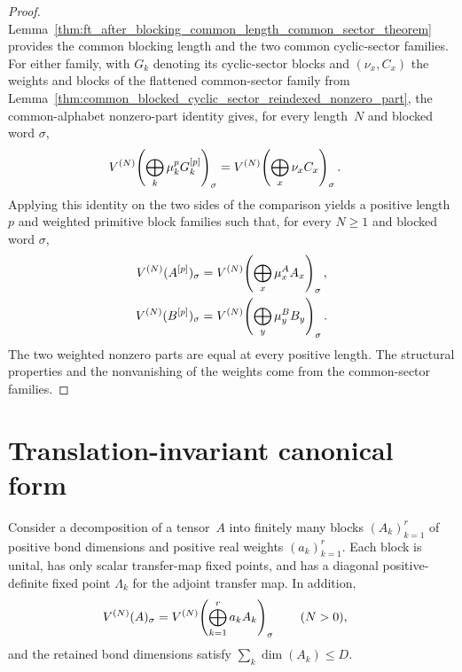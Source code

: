\begin{proof}
    \leanok
    Lemma~\ref{thm:ft_after_blocking_common_length_common_sector_theorem}
    provides the common blocking length and the two common cyclic-sector
    families. For either family, with $G_k$ denoting its cyclic-sector blocks and
    $(\nu_x,C_x)$ the weights and blocks of the flattened common-sector
    family from
    Lemma~\ref{thm:common_blocked_cyclic_sector_reindexed_nonzero_part}, the
    common-alphabet nonzero-part identity gives, for every length~$N$ and
    blocked word $\sigma$,
    \begin{align}
        V^{(N)}\!\left(\bigoplus_k\mu_k^pG_k^{[p]}\right)_\sigma
         & =
        V^{(N)}\!\left(\bigoplus_x\nu_xC_x\right)_\sigma.
        \notag
    \end{align}
    Applying this identity on the two sides of the comparison yields a
    positive length $p$ and weighted primitive block families such that, for
    every $N\ge1$ and blocked word $\sigma$,
    \begin{align}
        V^{(N)}(A^{[p]})_\sigma
         & =
        V^{(N)}\!\left(\bigoplus_x\mu_x^AA_x\right)_\sigma,
        \notag \\
        V^{(N)}(B^{[p]})_\sigma
         & =
        V^{(N)}\!\left(\bigoplus_y\mu_y^BB_y\right)_\sigma.
        \notag
    \end{align}
    The two weighted nonzero parts are equal at every positive length. The
    structural properties and the nonvanishing of the weights come from the
    common-sector families.
\end{proof}

\section{Translation-invariant canonical form}

\begin{definition}%
    \label{def:pgvwc07_positive_length_witness}
    \leanok
    Consider a decomposition of a tensor~$A$ into finitely many blocks
    $(A_k)_{k=1}^r$ of positive bond dimensions and positive real weights
    $(a_k)_{k=1}^r$. Each block is unital, has only scalar
    transfer-map fixed points, and has a diagonal positive-definite fixed point
    $\Lambda_k$ for the adjoint transfer map. In addition,
    \begin{align}
        V^{(N)}(A)_\sigma
         & =
        V^{(N)}\!\left(\bigoplus_{k=1}^r a_kA_k\right)_\sigma
        \qquad(N>0),
        \notag
    \end{align}
    and the retained bond dimensions satisfy $\sum_k\dim(A_k)\le D$.
\end{definition}

